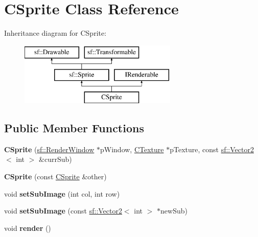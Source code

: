\hypertarget{classCSprite}{\section{C\-Sprite Class Reference}
\label{classCSprite}
}
Inheritance diagram for C\-Sprite\-:\begin{figure}[H]
\begin{center}
\leavevmode
\includegraphics[height=3.000000cm]{classCSprite}
\end{center}
\end{figure}
\subsection*{Public Member Functions}
\begin{DoxyCompactItemize}
\item 
\hypertarget{classCSprite_ab61dcd1df1595267721b37fca95a8227}{{\bfseries C\-Sprite} (\hyperlink{classsf_1_1RenderWindow}{sf\-::\-Render\-Window} $\ast$p\-Window, \hyperlink{classCTexture}{C\-Texture} $\ast$p\-Texture, const \hyperlink{classsf_1_1Vector2}{sf\-::\-Vector2}$<$ int $>$ \&curr\-Sub)}\label{classCSprite_ab61dcd1df1595267721b37fca95a8227}

\item 
\hypertarget{classCSprite_a7fa10fe45cf1683163671b7483ffc758}{{\bfseries C\-Sprite} (const \hyperlink{classCSprite}{C\-Sprite} \&other)}\label{classCSprite_a7fa10fe45cf1683163671b7483ffc758}

\item 
\hypertarget{classCSprite_a2162a3b87f87eecf9e9b93fe4c573690}{void {\bfseries set\-Sub\-Image} (int col, int row)}\label{classCSprite_a2162a3b87f87eecf9e9b93fe4c573690}

\item 
\hypertarget{classCSprite_a6e46dd766754438ebdefadf3449540da}{void {\bfseries set\-Sub\-Image} (const \hyperlink{classsf_1_1Vector2}{sf\-::\-Vector2}$<$ int $>$ $\ast$new\-Sub)}\label{classCSprite_a6e46dd766754438ebdefadf3449540da}

\item 
\hypertarget{classCSprite_aae147907de850db9bb7025e550264d22}{void {\bfseries render} ()}\label{classCSprite_aae147907de850db9bb7025e550264d22}

\end{DoxyCompactItemize}

